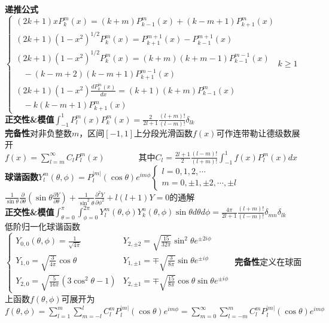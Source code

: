 \documentclass[10pt,a4paper]{article}
\begin{document}
\begin{multicols}{2}
\textbf{递推公式}$\left\{\begin{array}{l}(2k+1)xP_k^m(x)=(k+m)P_{k-1}^m(x)+(k-m+1)P_{k+1}^m(x)\\(2k+1)(1-x^2)^{1/2}P_k^m(x)=P_{k+1}^{m+1}(x)-P_{k-1}^{m+1}(x)\\(2k+1)(1-x^2)^{1/2}P_k^m(x)=(k+m)(k+m-1)P_{k-1}^{m-1}(x)\\~~~~-(k-m+2)(k-m+1)P_{k+1}^{m-1}(x)\\(2k+1)(1-x^2)\frac{dP_k^m(x)}{dx}=(k+1)(k+m)P_{k-1}^m(x)\\~~~~-k(k-m+1)P_{k+1}^m(x)\end{array}\right.k\geq1$\\
\textbf{正交性\&模值}$\int_{-1}^1P_l^m(x)P_k^m(x)=\frac{2}{2l+1}\frac{(l+m)!}{(l-m)!}\delta_{lk}$\\
\textbf{完备性}对非负整数$m$，区间$[-1,1]$上分段光滑函数$f(x)$可作连带勒让德级数展开\\
\indent$f(x)=\sum_{l=m}^{\infty}C_lP_l^m(x)$~~~~~~~~其中$C_l=\frac{2l+1}{2}\frac{(l-m)!}{(l+m)!}\int_{-1}^1f(x)P_l^m(x)dx$\\
\textbf{球谐函数}$Y_l^m(\theta,\phi)=P_l^{|m|}(\cos\theta)e^{im\phi}\left\{\begin{array}{l}l=0,1,2,\cdots\\m=0,\pm1,\pm2,\cdots,\pm l\end{array}\right.$\\
$\frac{1}{\sin\theta}\frac{\partial}{\partial\theta}(\sin\theta\frac{\partial Y}{\partial\theta})+\frac{1}{\sin^2\theta}\frac{\partial^2Y}{\partial\phi^2}+l(l+1)Y=0$的通解\\
\textbf{正交性\&模值}$\int_{\theta=0}^{\pi}\int_{\phi=0}^{2\pi}Y_l^m(\theta,\phi)Y_k^n(\theta,\phi)\sin\theta d\theta d\phi=\frac{4\pi}{2l+1}\frac{(l+m)!}{(l-m)!}\delta_{mn}\delta_{lk}$\\
低阶归一化球谐函数$\left\{\begin{array}{ll}Y_{0,0}(\theta,\phi)=\frac{1}{\sqrt{4\pi}}&Y_{2,\pm2}=\sqrt{\frac{15}{32\pi}}\sin^2\theta e^{\pm2i\phi}\\Y_{1,0}=\sqrt{\frac{3}{4\pi}}\cos\theta&Y_{1,\pm1}=\mp\sqrt{\frac{3}{8\pi}}\sin\theta e^{\pm i\phi}\\Y_{2,0}=\sqrt{\frac{5}{16\pi}}(3\cos^2\theta-1)&Y_{2,\pm1}=\mp\sqrt{\frac{15}{8\pi}}\cos\theta\sin\theta e^{\pm i\phi}\end{array}\right.$
\textbf{完备性}定义在球面上函数$f(\theta,\phi)$可展开为$f(\theta,\phi)=\sum_{l=1}^m\sum_{m=-l}^lC_l^mP_l^{|m|}(\cos\theta)e^{im\phi}=\sum_{m=0}^{\infty}\sum_{l=-m}^{m}C_l^mP_l^{|m|}(\cos\theta)e^{im\phi}$\\

\end{multicols}
\end{document}
